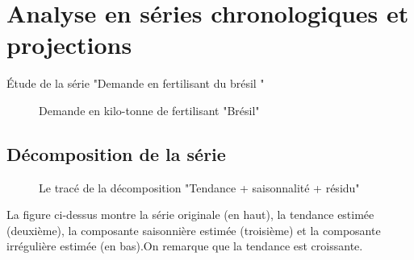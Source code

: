 	\section{Analyse en séries chronologiques et projections}
	Étude de la série "Demande en fertilisant du brésil "
	\begin{figure}[H]
		\centering
		\caption{Demande en kilo-tonne de fertilisant "Brésil"}
		\label{fig:dem}
	\end{figure}
	\subsection{Décomposition de la série}
	\begin{figure}[H]
		\centering
		\caption{Le tracé de la décomposition "Tendance + saisonnalité + résidu"}
		\label{fig:dec}
	\end{figure}
	La figure ci-dessus montre la série originale (en haut), la tendance estimée (deuxième), la composante saisonnière estimée (troisième) et la composante irrégulière estimée (en bas).On remarque que la tendance est croissante.
